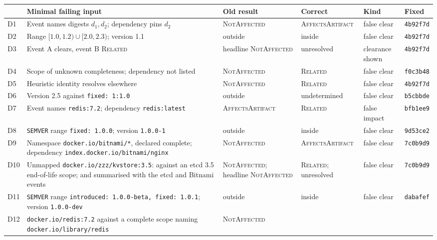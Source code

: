 \documentclass[11pt,a4paper]{article}
\newcommand{\code}[1]{\texttt{#1}}
\newcommand{\fixcommit}{\code{4b92f7d}}
\newcommand{\dsixcommit}{\code{b5cbbde}}
\newcommand{\dfourcommit}{\code{f0c3b48}}
\newcommand{\deightcommit}{\code{9d53ce2}}
\newcommand{\dninecommit}{\code{7c0b9d9}}
\newcommand{\delevencommit}{\code{dabafef}}
\newcommand{\dsevencommit}{\code{bfb1ee9}}
\begin{document}
\begin{table}[t]
\centering
\footnotesize
\begin{tabularx}{\linewidth}{@{}l >{\raggedright\arraybackslash}X >{\raggedright\arraybackslash}p{2.0cm} >{\raggedright\arraybackslash}p{2.0cm} >{\raggedright\arraybackslash}p{1.7cm} l@{}}
\toprule
& Minimal failing input & Old result & Correct & Kind & Fixed \\
\midrule
D1 & Event names digests $d_1,d_2$; dependency pins $d_2$ &
  \textsc{Not\-Affected} & \textsc{Affects\-Artifact} & false clear & \fixcommit{} \\
D2 & Range $[1.0,1.2)\cup[2.0,2.3)$; version 1.1 & outside & inside & false clear & \fixcommit{} \\
D3 & Event A clears, event B \textsc{Related} & headline \textsc{Not\-Affected}
  & unresolved & clearance shown & \fixcommit{} \\
D4 & Scope of unknown completeness; dependency not listed &
  \textsc{Not\-Affected} & \textsc{Related} & false clear & \dfourcommit{} \\
D5 & Heuristic identity resolves elsewhere & \textsc{Not\-Affected} &
  \textsc{Related} & false clear & \fixcommit{} \\
D6 & Version 2.5 against \code{fixed: 1:1.0} & outside & undetermined &
  false clear & \dsixcommit{} \\
D7 & Event names \code{redis:7.2}; dependency \code{redis:latest} &
  \textsc{Affects\-Artifact} & \textsc{Related} & false impact & \dsevencommit{} \\
D8 & \code{SEMVER} range \code{fixed: 1.0.0}; version \code{1.0.0-1} &
  outside & inside & false clear & \deightcommit{} \\
D9 & Namespace \code{docker.io/bitnami/*}, declared complete;
  dependency \code{index.docker.io/bitnami/nginx} & \textsc{Not\-Affected}
  & \textsc{Affects\-Artifact} & false clear & \dninecommit{} \\
D10 & Unmapped \code{docker.io/zzz/kvstore:3.5}: against an etcd 3.5
  end-of-life scope; and summarised with the etcd and Bitnami events &
  \textsc{Not\-Affected}; headline \textsc{Not\-Affected} &
  \textsc{Related}; unresolved & false clear & \dninecommit{} \\
D11 & \code{SEMVER} range \code{introduced: 1.0.0-beta, fixed: 1.0.1};
  version \code{1.0.0-dev} & outside & inside & false clear & \delevencommit{} \\
D12 & \code{docker.io/redis:7.2} against a complete scope naming
  \code{docker.io/library/redis} & \textsc{Not\-Affected} &

\end{tabularx}
\end{table}
\end{document}
